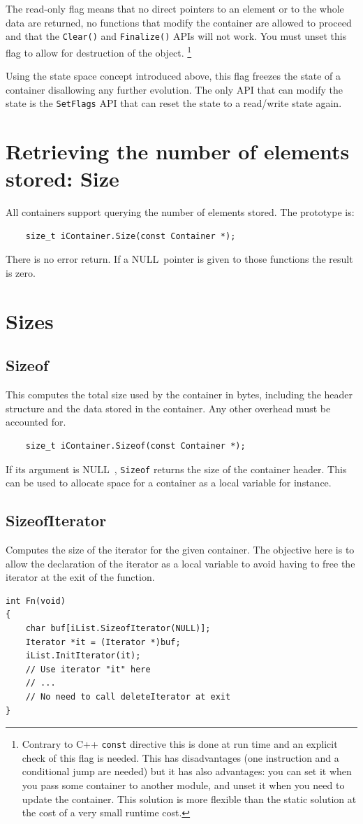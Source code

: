 \documentclass[12pt,a4paper]{memoir} %
\newif\iftth
\newcommand{\Null}{{\iftth \ NULL \else \footnotesize NULL\  \fi}}
\begin{document}
The read-only flag means that no direct pointers to an element or to the whole data are returned, no functions that modify the
container are allowed to proceed and that the \verb,Clear(),
and \verb,Finalize(), APIs will not work. You must unset this flag to allow for destruction of the object.
\footnote{Contrary to C++ \texttt{const} directive this is done at run time and an explicit check of this flag is needed. This has disadvantages 
(one instruction and a conditional jump are needed) but it has also advantages: you can set it when you pass some container to another module, and unset it when you need to update the container. This solution is more flexible than the static solution at the cost of a very small runtime cost.}

Using the state space concept introduced above, this flag freezes the state of a container disallowing any further evolution. The only API that
can modify the state is the \verb,SetFlags, API that can reset the state to a read/write state again.
\section{Retrieving the number of elements stored: Size}
All containers support querying the number of elements stored. The prototype is:
\begin{verbatim}
    size_t iContainer.Size(const Container *);
\end{verbatim}
There is no error return. If a \Null pointer is given to those functions the result is zero.
\section{Sizes}
\subsection{Sizeof}
This computes the total size used by the container in bytes, including the header structure and the data stored in the container. Any other overhead 
must be accounted for.
\begin{verbatim}
    size_t iContainer.Sizeof(const Container *);
\end{verbatim}

If its argument is \Null, \texttt{Sizeof} returns the size of the container header. This can be used to allocate space for a container as a local variable for instance.

\subsection{SizeofIterator}
Computes the size of the iterator for the given container. The objective here is to allow the declaration of the iterator as a local variable
to avoid having to free the iterator at the exit of the function.
\begin{verbatim}
int Fn(void)
{
    char buf[iList.SizeofIterator(NULL)];
    Iterator *it = (Iterator *)buf;
    iList.InitIterator(it);
    // Use iterator "it" here
    // ...
    // No need to call deleteIterator at exit
}
\end{verbatim}
\end{document}

